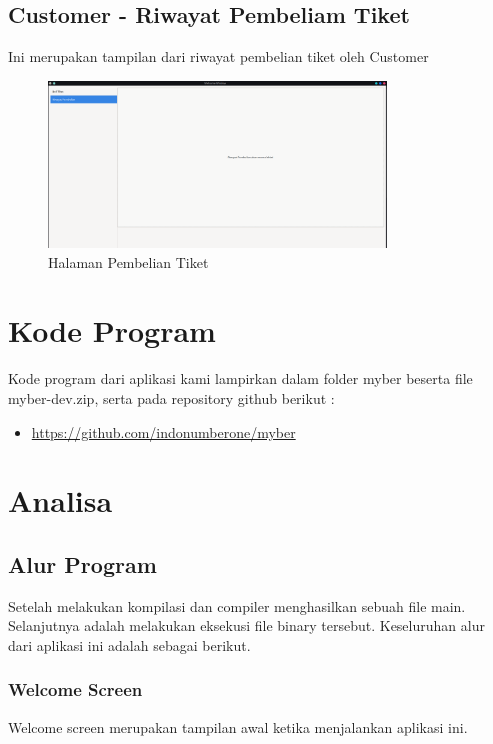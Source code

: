\documentclass[a4paper,12pt]{article}
\begin{document}
\subsection{Customer - Riwayat Pembeliam Tiket}
Ini merupakan tampilan dari riwayat pembelian tiket oleh Customer
\begin{figure}[!htbp]
    \centering
    \includegraphics[width=0.8\textwidth]{./Riwayat-User.png}
    \caption{Halaman Pembelian Tiket}

\end{figure}
\FloatBarrier 

\section{Kode Program}
Kode program dari aplikasi kami lampirkan dalam folder myber beserta file myber-dev.zip, serta pada repository github berikut :
\begin{itemize}
    \item \url{https://github.com/indonumberone/myber}
\end{itemize}

\section{Analisa}

\subsection{Alur Program}
Setelah melakukan kompilasi dan compiler menghasilkan sebuah file main. Selanjutnya adalah melakukan eksekusi file binary tersebut. Keseluruhan alur dari aplikasi ini adalah sebagai berikut.

\subsubsection{Welcome Screen}
Welcome screen merupakan tampilan awal ketika menjalankan aplikasi ini.
\end{document}
